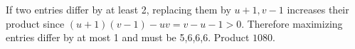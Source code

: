 If two entries differ by at least 2, replacing them by $u+1,v-1$ increases their product since $(u+1)(v-1)-uv=v-u-1>0$. Therefore maximizing entries differ by at most 1 and must be 5,6,6,6. Product $\boxed{1080}$.
